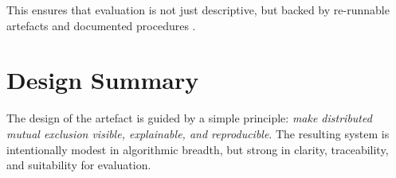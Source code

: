 This ensures that evaluation is not just descriptive, but backed by re-runnable artefacts and documented procedures \cite{sandve2013ten,wilson2014best,wilkinson2016fair}.

\section{Design Summary}
The design of the artefact is guided by a simple principle: \emph{make distributed mutual exclusion visible, explainable, and reproducible}. The resulting system is intentionally modest in algorithmic breadth, but strong in clarity, traceability, and suitability for evaluation.